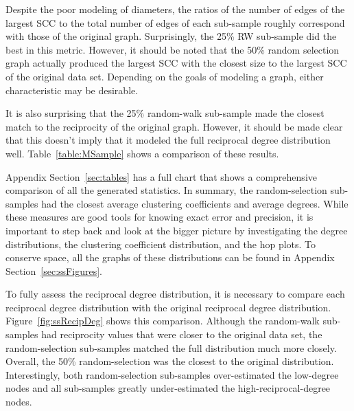 \documentclass[pdftex,11pt,a4paper,twocolumn]{scrartcl}
\begin{document}
Despite the poor modeling of diameters, the ratios of the number of edges of the largest SCC to the total number of edges of each sub-sample roughly correspond with those of the original graph. Surprisingly, the 25\% RW sub-sample did the best in this metric. However, it should be noted that the 50\% random selection graph actually produced the largest SCC with the closest size to the largest SCC of the original data set. Depending on the goals of modeling a graph, either characteristic may be desirable. 

It is also surprising that the 25\% random-walk sub-sample made the closest match to the reciprocity of the original graph. However, it should be made clear that this doesn't imply that it modeled the full reciprocal degree distribution well. Table~\ref{table:MSample} shows a comparison of these results. 

\begin{table}[h]
\centering
{}
\caption{Metrics of Sampled Graphs}
\label{table:MSample}
\end{table}

Appendix Section~\ref{sec:tables} has a full chart that shows a comprehensive comparison of all the generated statistics. In summary, the random-selection sub-samples had the closest average clustering coefficients and average degrees. While these measures are good tools for knowing exact error and precision, it is important to step back and look at the bigger picture by investigating the degree distributions, the clustering coefficient distribution, and the hop plots. To conserve space, all the graphs of these distributions can be found in Appendix Section~\ref{sec:ssFigures}. 

To fully assess the reciprocal degree distribution, it is necessary to compare each reciprocal degree distribution with the original reciprocal degree distribution. Figure~\ref{fig:ssRecipDeg} shows this comparison. Although the random-walk sub-samples had reciprocity values that were closer to the original data set, the random-selection sub-samples matched the full distribution much more closely. Overall, the 50\% random-selection was the closest to the original distribution. Interestingly, both random-selection sub-samples over-estimated the low-degree nodes and all sub-samples greatly under-estimated the high-reciprocal-degree nodes. 
\end{document}
